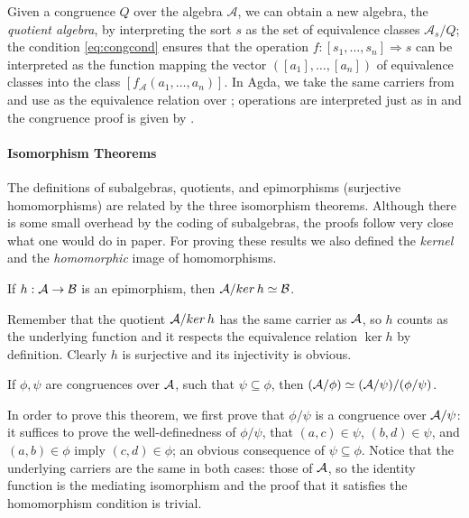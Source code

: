 Given a congruence $Q$ over the algebra $\mathcal{A}$, we can obtain a
new algebra, the \emph{quotient algebra}, by interpreting the sort $s$
as the set of equivalence classes $\mathcal{A}_s / Q$; the condition
\eqref{eq:congcond} ensures that the operation $ f : [s_1, \ldots,s_n]
\Rightarrow s$ can be interpreted as the function mapping the vector
$([a_1],\ldots,[a_n])$ of equivalence classes into the class $[
f_\mathcal{A}(a_1,\ldots,a_n)]$. In Agda, we take the same carriers
from  and use \AgdaSpace{} as the equivalence relation over
\AgdaSpace{}\AgdaSpace{}\AgdaSpace{}\AgdaSpace{}\AgdaSpace{}; operations are interpreted just as in  and the congruence proof
is given by \AgdaSpace{}.

\paragraph*{Isomorphism Theorems} The definitions of subalgebras,
quotients, and epimorphisms (surjective homomorphisms) are related by
the three isomorphism theorems. Although there is some small overhead
by the coding of subalgebras, the proofs follow very close what one would
do in paper. For proving these results we also defined the
\emph{kernel} and the \emph{homomorphic} image of homomorphisms.

\begin{theorem} If $h : \mathcal{A} \rightarrow \mathcal{B}$
is an epimorphism, then $\mathcal{A} /\! \mathop{ker} h \simeq \mathcal{B}$.
\end{theorem}
\noindent Remember that the quotient $\mathcal{A} /\! \mathop{ker} h$ has
the same carrier as $\mathcal{A}$, so $h$ counts as the underlying function
and it respects the equivalence relation $\mathop{ker} h$ by
definition. Clearly $h$ is surjective and its injectivity is obvious.

\begin{theorem} If $\phi,\psi$ are congruences over $\mathcal{A}$,
such that $\psi \subseteq \phi$, then $(\mathcal{A} / \phi) \simeq (\mathcal{A} / \psi)/(\phi / \psi)$. 
\end{theorem}

\noindent In order to prove this theorem, we first prove that
$\phi / \psi$ is a congruence over $\mathcal{A} / \psi$: it suffices to
prove the well-definedness of $\phi / \psi$, \ie that
$(a,c) \in \psi$, $(b,d) \in \psi$, and $(a,b) \in \phi$ imply
$(c,d) \in \phi$; an obvious consequence of $\psi \subseteq
\phi$. Notice that the underlying carriers are the same in both cases:
those of $\mathcal{A}$, so the identity function is the mediating
isomorphism and the proof that it satisfies the homomorphism condition
is trivial.

